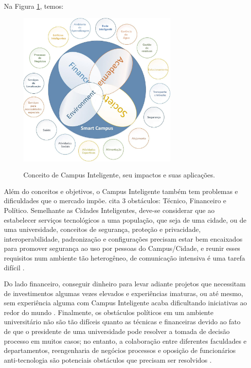 Na Figura \ref{alghamdi}, temos:

\begin{figure}[!hbtp]
	\centering
	\caption{Conceito de Campus Inteligente, seu impactos e suas aplicações.}
	\includegraphics[width=8cm]{./04-figuras/alghamdi-edited.jpg}
	\label{alghamdi}
\end{figure}

Além do conceitos e objetivos, o Campus Inteligente também tem problemas e dificuldades que o mercado impõe. \cite{alghamdi} cita 3 obstáculos: Técnico, Financeiro e Político. Semelhante as Cidades Inteligentes, deve-se considerar que ao estabelecer serviços tecnológicos a uma população, que seja de uma cidade, ou de uma universidade, conceitos de segurança, proteção e privacidade, interoperabilidade, padronização e configurações precisam estar bem encaixados para promover segurança ao uso por pessoas do Campus/Cidade, e reunir esses requisitos num ambiente tão heterogêneo, de comunicação intensiva é uma tarefa difícil \cite{alghamdi}. 

Do lado financeiro, conseguir dinheiro para levar adiante projetos que necessitam de investimentos algumas vezes elevados e experiências imaturas, ou até mesmo, sem experiência alguma com Campus Inteligente acaba dificultando iniciativas ao redor do mundo . Finalmente, os obstáculos políticos em um ambiente universitário
não são tão difíceis quanto as técnicas e financeiras devido ao
fato de que o presidente de uma universidade pode resolver a tomada de decisão processo em muitos casos; no entanto, a colaboração entre
diferentes faculdades e departamentos, reengenharia de negócios
processos e oposição de funcionários anti-tecnologia são potenciais
obstáculos que precisam ser resolvidos \cite{alghamdi}.

